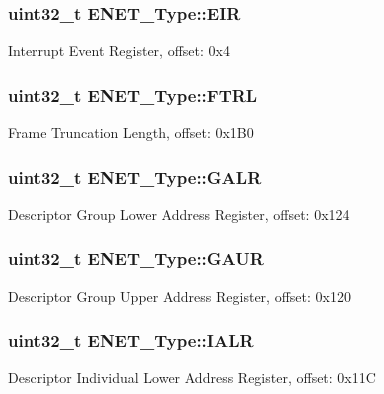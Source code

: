 \subsubsection[{\texorpdfstring{E\+IR}{EIR}}]{ uint32\+\_\+t E\+N\+E\+T\+\_\+\+Type\+::\+E\+IR}\hypertarget{structENET__Type_a2ff7649428a079dfb1cc80b9dd6ef26b}{}\label{structENET__Type_a2ff7649428a079dfb1cc80b9dd6ef26b}
Interrupt Event Register, offset\+: 0x4 
\subsubsection[{\texorpdfstring{F\+T\+RL}{FTRL}}]{ uint32\+\_\+t E\+N\+E\+T\+\_\+\+Type\+::\+F\+T\+RL}\hypertarget{structENET__Type_ad2a1600d156232df571e5ae8654f71c4}{}\label{structENET__Type_ad2a1600d156232df571e5ae8654f71c4}
Frame Truncation Length, offset\+: 0x1\+B0 
\subsubsection[{\texorpdfstring{G\+A\+LR}{GALR}}]{ uint32\+\_\+t E\+N\+E\+T\+\_\+\+Type\+::\+G\+A\+LR}\hypertarget{structENET__Type_ad6467ea10354c07b7127d11367790de4}{}\label{structENET__Type_ad6467ea10354c07b7127d11367790de4}
Descriptor Group Lower Address Register, offset\+: 0x124 
\subsubsection[{\texorpdfstring{G\+A\+UR}{GAUR}}]{ uint32\+\_\+t E\+N\+E\+T\+\_\+\+Type\+::\+G\+A\+UR}\hypertarget{structENET__Type_a3b405b74d63c05ee1d49038985f486cd}{}\label{structENET__Type_a3b405b74d63c05ee1d49038985f486cd}
Descriptor Group Upper Address Register, offset\+: 0x120 
\subsubsection[{\texorpdfstring{I\+A\+LR}{IALR}}]{ uint32\+\_\+t E\+N\+E\+T\+\_\+\+Type\+::\+I\+A\+LR}\hypertarget{structENET__Type_acb6f578ad2bcc9e083e832a77e513ed3}{}\label{structENET__Type_acb6f578ad2bcc9e083e832a77e513ed3}
Descriptor Individual Lower Address Register, offset\+: 0x11C 
